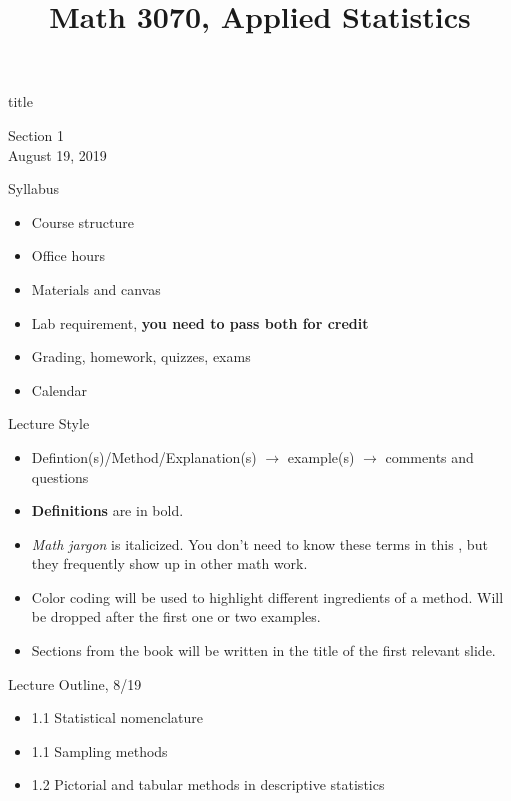 \documentclass{beamer}
\title{Math 3070, Applied Statistics}
\newcommand{\blue}[1]{{\color{blue} #1}}
\newcommand{\red}[1]{{\color{red} #1}}
\newcommand{\nl}[1]{\vspace{#1 em}}
\begin{document}
\begin{frame}
    \begin{beamercolorbox}[rounded=true,wd=\textwidth,center]{title}
        \inserttitle
    \end{beamercolorbox}
    \begin{center}
        Section 1\\
        \nl{0.5}
        August 19, 2019
    \end{center}

\end{frame}

\begin{frame}{Syllabus}
    \begin{itemize}
        \item Course structure
        \item Office hours
        \item Materials and canvas
        \item Lab requirement, {\bf you need to pass both for credit}
        \item Grading, homework, quizzes, exams
        \item Calendar
    \end{itemize}
\end{frame}

\begin{frame}{Lecture Style}
    \begin{itemize}
        \item Defintion(s)/Method/Explanation(s) $\rightarrow$ example(s) $\rightarrow$ comments and questions
        \item {\bf Definitions} are in bold.
        \item {\it Math jargon} is italicized. You don't need to know these terms in this , but they frequently show up in other math work.
        \item \blue{Color} \red{coding} will be used to highlight different ingredients of a method. Will be dropped after the first one or two examples.
        \item Sections from the book will be written in the title of the first relevant slide.
    \end{itemize}
\end{frame}

\begin{frame}{Lecture Outline, 8/19}
    \begin{itemize}
        \item 1.1 Statistical nomenclature
        \item 1.1 Sampling methods
        \item 1.2 Pictorial and tabular methods in descriptive statistics
    \end{itemize}
\end{frame}
\end{document}
